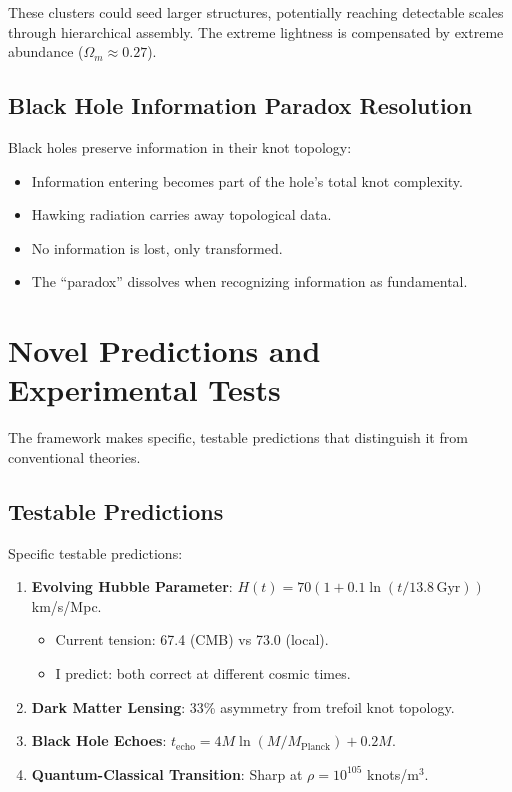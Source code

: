 \documentclass{article}
\begin{document}
These clusters could seed larger structures, potentially reaching detectable scales through hierarchical assembly. The extreme lightness is compensated by extreme abundance ($\Omega_m \approx 0.27$).

\subsection{Black Hole Information Paradox Resolution}
Black holes preserve information in their knot topology:
\begin{itemize}
\item Information entering becomes part of the hole's total knot complexity.
\item Hawking radiation carries away topological data.
\item No information is lost, only transformed.
\item The ``paradox'' dissolves when recognizing information as fundamental.
\end{itemize}

\section{Novel Predictions and Experimental Tests}
The framework makes specific, testable predictions that distinguish it from conventional theories.

\subsection{Testable Predictions}
Specific testable predictions:
\begin{enumerate}
\item \textbf{Evolving Hubble Parameter}: $H(t) = 70(1 + 0.1 \ln(t / 13.8 \, \text{Gyr}))$ km/s/Mpc.
   \begin{itemize}
   \item Current tension: 67.4 (CMB) vs 73.0 (local).
   \item I predict: both correct at different cosmic times.
   \end{itemize}
\item \textbf{Dark Matter Lensing}: 33\% asymmetry from trefoil knot topology.
\item \textbf{Black Hole Echoes}: $t_{\text{echo}} = 4M \ln(M / M_{\text{Planck}}) + 0.2M$.
\item \textbf{Quantum-Classical Transition}: Sharp at $\rho = 10^{105}$ knots/m$^3$.
\end{enumerate}
\end{document}
